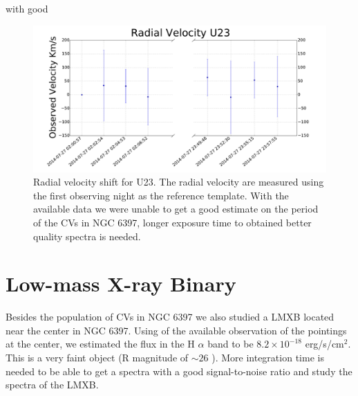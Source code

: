 with good


\begin{figure}
        \centering
        \includegraphics[scale=.3]{assets/images/radU23.pdf}
\caption{Radial velocity shift for U23. The radial velocity are measured using the first observing night as the reference template. With the available data we were unable to get a good estimate on the period of the CVs in NGC 6397, longer exposure time to obtained better quality spectra is needed.}
\label{fig:radU23}
\end{figure}


\section{Low-mass X-ray Binary}
Besides the population of CVs in NGC 6397 we also studied a LMXB located near the center in NGC 6397. Using of the available observation of the pointings at the center, we estimated the flux in the H $\alpha$ band to be $8.2 \times 10^{-18}$ erg/s/cm$^2$. This is a very faint object (R magnitude of $\sim 26$ \citep{heinke_improved_2014}). More integration time is needed to be able to get a spectra with a good signal-to-noise ratio and study the spectra of the LMXB. 


